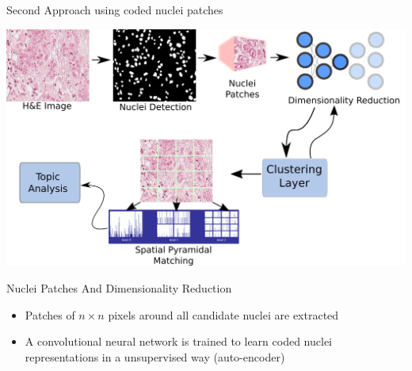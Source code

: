 \documentclass[usenames,dvipsnames]{beamer}
\begin{document}
\begin{frame}{Second Approach using coded nuclei patches}

\includegraphics[width = \textwidth]{imagenes/newproposalSP.png}



\end{frame}

\begin{frame}{Nuclei Patches And Dimensionality Reduction}
\begin{itemize}
\item<1-> Patches of $n \times n $ pixels around all candidate nuclei are extracted

\item<2-> A convolutional neural network is trained to learn coded nuclei representations in a unsupervised way (auto-encoder)

\end{itemize}



\end{frame}
\end{document}
